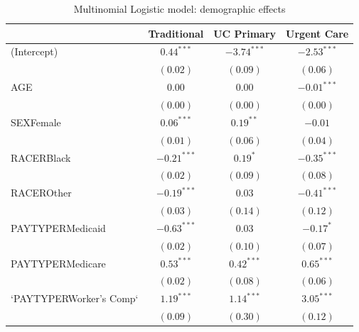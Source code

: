 \documentclass[12pt,twoside]{reedthesis}
\begin{document}
  \begin{table}
  \caption{Multinomial Logistic model: demographic effects}
  \begin{center}
  \begin{footnotesize}
  \begin{tabular}{l c c c }
  \hline
   & Traditional & UC Primary & Urgent Care \\
  \hline
  (Intercept)              & $\mathbf{0.44}^{***}$  & $\mathbf{-3.74}^{***}$ & $\mathbf{-2.53}^{***}$ \\
                           & $(0.02)$               & $(0.09)$               & $(0.06)$               \\
  AGE                      & $0.00$                 & $0.00$                 & $\mathbf{-0.01}^{***}$ \\
                           & $(0.00)$               & $(0.00)$               & $(0.00)$               \\
  SEXFemale                & $\mathbf{0.06}^{***}$  & $0.19^{**}$            & $-0.01$                \\
                           & $(0.01)$               & $(0.06)$               & $(0.04)$               \\
  RACERBlack               & $\mathbf{-0.21}^{***}$ & $0.19^{*}$             & $\mathbf{-0.35}^{***}$ \\
                           & $(0.02)$               & $(0.09)$               & $(0.08)$               \\
  RACEROther               & $\mathbf{-0.19}^{***}$ & $0.03$                 & $\mathbf{-0.41}^{***}$ \\
                           & $(0.03)$               & $(0.14)$               & $(0.12)$               \\
  PAYTYPERMedicaid         & $\mathbf{-0.63}^{***}$ & $0.03$                 & $-0.17^{*}$            \\
                           & $(0.02)$               & $(0.10)$               & $(0.07)$               \\
  PAYTYPERMedicare         & $\mathbf{0.53}^{***}$  & $\mathbf{0.42}^{***}$  & $\mathbf{0.65}^{***}$  \\
                           & $(0.02)$               & $(0.08)$               & $(0.06)$               \\
  `PAYTYPERWorker's Comp`  & $\mathbf{1.19}^{***}$  & $\mathbf{1.14}^{***}$  & $\mathbf{3.05}^{***}$  \\
                           & $(0.09)$               & $(0.30)$               & $(0.12)$               \\

\end{tabular}
\end{footnotesize}
\end{center}
\end{table}
\end{document}
